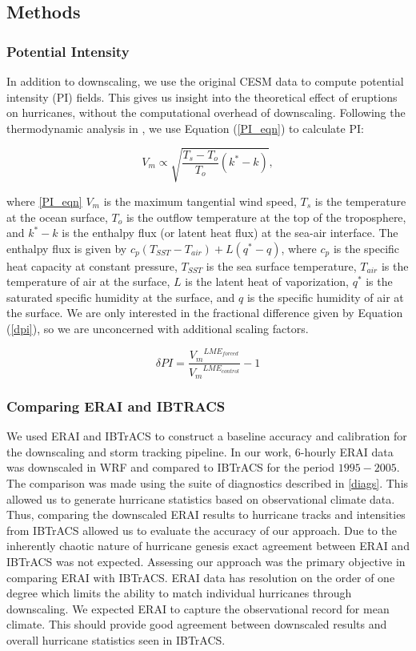 \subsection{Methods}
\subsubsection{Potential Intensity}
In addition to downscaling, we use the original CESM data to compute potential intensity (PI) fields. This gives us insight into the theoretical effect of eruptions on hurricanes, without the computational overhead of downscaling. Following the thermodynamic analysis in \cite{pi_ke}, we use Equation (\ref{PI_eqn}) to calculate PI:

\begin{equation}
{V_m} \propto \sqrt{\frac{T_s-T_{o}}{T_{o}}(k^{*}-k)},
\label{PI_eqn}
\end{equation}

where \ref{PI_eqn} $V_m$ is the maximum tangential wind speed, $T_s$ is the temperature at the ocean surface, $T_o$ is the outflow temperature at the top of the troposphere, and $k^{*}-k$ is the enthalpy flux (or latent heat flux) at the sea-air interface. The enthalpy flux is given by $c_p(T_{SST}-T_{air})+L(q^{*}-q)$, where $c_p$ is the specific heat capacity at constant pressure, $T_{SST}$ is the sea surface temperature, $T_{air}$ is the temperature of air at the surface, $L$ is the latent heat of vaporization, $q^{*}$ is the saturated specific humidity at the surface, and $q$ is the specific humidity of air at the surface. We are only interested in the fractional difference given by Equation (\ref{dpi}), so we are unconcerned with additional scaling factors.

\begin{equation}
\delta PI = \frac{{V_{m}}^{LME_{forced}}}{{V_{m}}^{LME_{control}}}-1
\label{dpi}
\end{equation}

\subsubsection{Comparing ERAI and IBTRACS}
We used ERAI and IBTrACS to construct a baseline accuracy and calibration for the downscaling and storm tracking pipeline. In our work, $6$-hourly ERAI data was downscaled in WRF and compared to IBTrACS for the period $1995-2005$. The comparison was made using the suite of diagnostics described in \ref{diags}. This allowed us to generate hurricane statistics based on observational climate data. Thus, comparing the downscaled ERAI results to hurricane tracks and intensities from IBTrACS allowed us to evaluate the accuracy of our approach. Due to the inherently chaotic nature of hurricane genesis exact agreement between ERAI and IBTrACS was not expected. Assessing our approach was the primary objective in comparing ERAI with IBTrACS. ERAI data has resolution on the order of one degree which limits the ability to match individual hurricanes through downscaling. We expected ERAI to capture the observational record for mean climate. This should provide good agreement between downscaled results and overall hurricane statistics seen in IBTrACS. 

